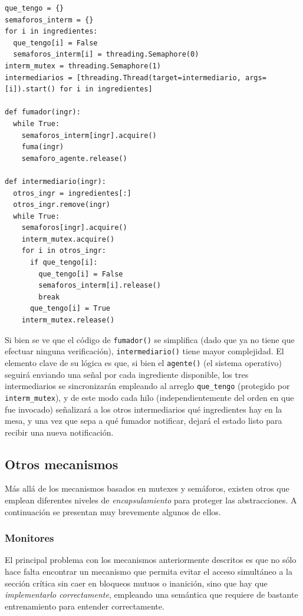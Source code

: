 \documentclass[11pt,fleqn]{book} %
\begin{document}
\begin{verbatim}
que_tengo = {}
semaforos_interm = {}
for i in ingredientes:
  que_tengo[i] = False
  semaforos_interm[i] = threading.Semaphore(0)
interm_mutex = threading.Semaphore(1)
intermediarios = [threading.Thread(target=intermediario, args=[i]).start() for i in ingredientes]

def fumador(ingr):
  while True:
    semaforos_interm[ingr].acquire()
    fuma(ingr)
    semaforo_agente.release()

def intermediario(ingr):
  otros_ingr = ingredientes[:]
  otros_ingr.remove(ingr)
  while True:
    semaforos[ingr].acquire()
    interm_mutex.acquire()
    for i in otros_ingr:
      if que_tengo[i]:
        que_tengo[i] = False
        semaforos_interm[i].release()
        break
      que_tengo[i] = True
    interm_mutex.release()
\end{verbatim}

Si bien se ve que el código de \texttt{fumador()} se simplifica (dado que ya
no tiene que efectuar ninguna verificación), \texttt{intermediario()} tiene
mayor complejidad. El elemento clave de su lógica es que, si bien el
\texttt{agente()} (el sistema operativo) seguirá enviando una señal por
cada ingrediente disponible, los tres intermediarios se sincronizarán
empleando al arreglo \texttt{que\_tengo} (protegido por \texttt{interm\_mutex}), y de
este modo cada hilo (independientemente del orden en que fue invocado)
señalizará a los otros intermediarios qué ingredientes hay en la mesa,
y una vez que sepa a qué fumador notificar, dejará el estado listo
para recibir una nueva notificación.
\subsection{Otros mecanismos}
\label{sec-3-3-9}


Más allá de los mecanismos basados en mutexes y semáforos, existen
otros que emplean diferentes niveles de \emph{encapsulamiento}
para proteger las abstracciones. A continuación se presentan muy
brevemente algunos de ellos.
\subsubsection{Monitores}
\label{sec-3-3-9-1}


El principal problema con los mecanismos anteriormente descritos es
que no sólo hace falta encontrar un mecanismo que permita evitar el
acceso simultáneo a la sección crítica sin caer en bloqueos mutuos o
inanición, sino que hay que \emph{implementarlo correctamente}, empleando
una semántica que requiere de bastante entrenamiento para entender
correctamente.
\end{document}

